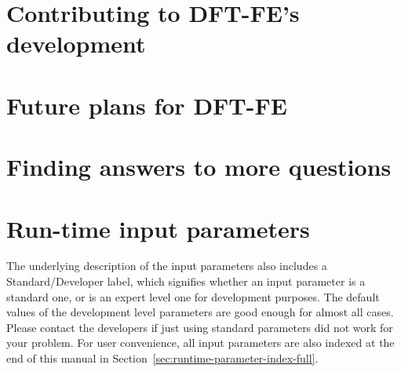 \documentclass{article}
\newcommand{\dftfe}{\textsc{DFT-FE}}
\begin{document}
\section{Contributing to \dftfe{}'s development}
\label{sec:contributing}



\section{Future plans for \dftfe}
\label{sec:future}




\section{Finding answers to more questions}
\label{sec:questions-and-answers}



\appendix

\section{Run-time input parameters}
\label{sec:parameters}
The underlying description of the input parameters also includes a Standard/Developer label, which signifies whether an input parameter is
a standard one, or is an expert level one for development purposes. The default values of the development level parameters are good enough
for almost all cases. Please contact the developers if just using standard parameters did not work for your problem. For user convenience,
all input parameters are also indexed at the end of this manual in Section~\ref{sec:runtime-parameter-index-full}.



\pagebreak


\let\myRefname\refname
\renewcommand\refname{%
  \addcontentsline{toc}{section}{\numberline{}References}
  \myRefname
}




\pagebreak


\printindex[prmindexfull]
\end{document}
